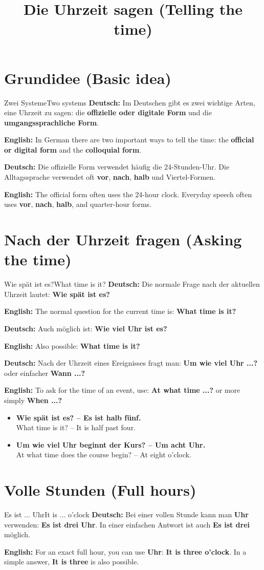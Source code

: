\documentclass[a4paper,11pt]{article}
\title{Die Uhrzeit sagen \textnormal{(Telling the time)}}
\date{}
\newcommand{\GermanText}[1]{\textbf{Deutsch: }#1\par}
\newcommand{\EnglishText}[1]{{\small\color{SoftGray}\textbf{English: }#1\par}}
\newcommand{\ExampleItem}[2]{\item \textbf{#1}\\{\small\color{SoftGray}#2}}
\begin{document}
\maketitle
\tableofcontents
\newpage
\section{Grundidee \textnormal{(Basic idea)}}
\begin{grammarentry}{Zwei Systeme}{Two systems}
\GermanText{Im Deutschen gibt es zwei wichtige Arten, eine Uhrzeit zu sagen: die \textbf{offizielle oder digitale Form} und die \textbf{umgangssprachliche Form}.}
\EnglishText{In German there are two important ways to tell the time: the \textbf{official or digital form} and the \textbf{colloquial form}.}
\GermanText{Die offizielle Form verwendet häufig die 24-Stunden-Uhr. Die Alltagssprache verwendet oft \textbf{vor}, \textbf{nach}, \textbf{halb} und Viertel-Formen.}
\EnglishText{The official form often uses the 24-hour clock. Everyday speech often uses \textbf{vor}, \textbf{nach}, \textbf{halb}, and quarter-hour forms.}
\end{grammarentry}
\section{Nach der Uhrzeit fragen \textnormal{(Asking the time)}}
\begin{grammarentry}{Wie spät ist es?}{What time is it?}
\GermanText{Die normale Frage nach der aktuellen Uhrzeit lautet: \textbf{Wie spät ist es?}}
\EnglishText{The normal question for the current time is: \textbf{What time is it?}}
\GermanText{Auch möglich ist: \textbf{Wie viel Uhr ist es?}}
\EnglishText{Also possible: \textbf{What time is it?}}
\GermanText{Nach der Uhrzeit eines Ereignisses fragt man: \textbf{Um wie viel Uhr ...?} oder einfacher \textbf{Wann ...?}}
\EnglishText{To ask for the time of an event, use: \textbf{At what time ...?} or more simply \textbf{When ...?}}
\end{grammarentry}
\begin{exbox}\begin{itemize}
\ExampleItem{Wie spät ist es? -- Es ist halb fünf.}{What time is it? -- It is half past four.}
\ExampleItem{Um wie viel Uhr beginnt der Kurs? -- Um acht Uhr.}{At what time does the course begin? -- At eight o'clock.}
\end{itemize}\end{exbox}
\section{Volle Stunden \textnormal{(Full hours)}}
\begin{grammarentry}{Es ist ... Uhr}{It is ... o'clock}
\GermanText{Bei einer vollen Stunde kann man \textbf{Uhr} verwenden: \textbf{Es ist drei Uhr}. In einer einfachen Antwort ist auch \textbf{Es ist drei} möglich.}
\EnglishText{For an exact full hour, you can use \textbf{Uhr}: \textbf{It is three o'clock}. In a simple answer, \textbf{It is three} is also possible.}
\end{grammarentry}
\end{document}
